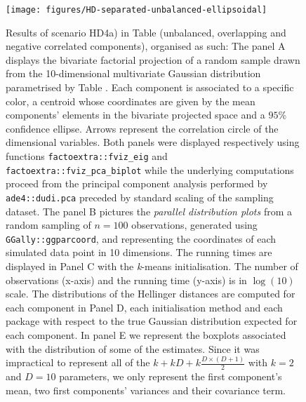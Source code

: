 \begin{figure}[htbp]

{\centering \texttt{[image: figures/HD-separated-unbalanced-ellipsoidal]} 

}

\caption{Results of scenario HD4a) in Table  (unbalanced, overlapping and negative correlated components), organised as such:
The panel A displays the bivariate factorial projection of a random sample drawn from the 10-dimensional multivariate Gaussian distribution parametrised by Table . Each component is associated to a specific color, a centroid whose coordinates are given by the mean components' elements in the bivariate projected space and a $95\%$ confidence ellipse. Arrows represent the correlation circle of the dimensional variables.
 Both panels were displayed respectively using functions \texttt{factoextra::fviz\_eig} and \texttt{factoextra::fviz\_pca\_biplot} while the underlying computations proceed from the principal component analysis performed by \texttt{ade4::dudi.pca} preceded by standard scaling of the sampling dataset.
The panel B pictures the \emph{parallel distribution plots} from a random sampling of $n=100$ observations, generated using \texttt{GGally::ggparcoord}, and representing the coordinates of each simulated data point in 10 dimensions.
The running times are displayed in Panel C with the \emph{k}-means initialisation. The number of observations (x-axis) and the running time (y-axis) is in $\log(10)$ scale.
The distributions of the Hellinger distances are computed for each component in Panel D, each initialisation method and each package with respect to the true Gaussian distribution expected for each component.
In panel E we represent the boxplots associated with the distribution of some of the estimates. Since it was impractical to represent all of the $k + kD + k\frac{D \times (D+1)}{2}$ with $k=2$ and $D=10$ parameters, we only represent the first component's mean, two first components' variances and their covariance term.}\label{fig:HD-separated-unbalanced-ellipsoidal-plot}
\end{figure}

\newpage

